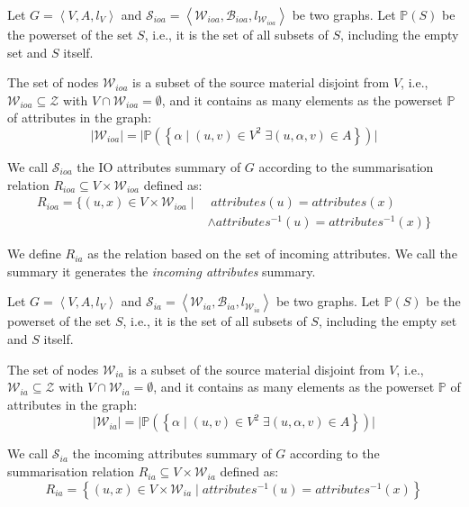 \begin{definition}
	Let $G=\left\langle V, A, l_V \right\rangle$ and $\mathcal{S}_{ioa} = \left\langle \mathcal{W}_{ioa}, \mathcal{B}_{ioa}, l_{\mathcal{W}_{ioa}} \right\rangle$ be two graphs. Let $\mathbb{P}(S)$ be the powerset of the set $S$, i.e., it is the set of all subsets of $S$, including the empty set and $S$ itself.

	The set of nodes $\mathcal{W}_{ioa}$ is a subset of the source material disjoint from $V$, i.e., $\mathcal{W}_{ioa} \subseteq \mathcal{Z}$ with $V \cap \mathcal{W}_{ioa} = \emptyset$, and it contains as many elements as the powerset $\mathbb{P}$ of attributes in the graph:
	$$
	\lvert \mathcal{W}_{ioa} \rvert = \lvert \mathbb{P}\left( \left\lbrace \alpha \mid (u, v) \in V^2\; \exists (u, \alpha, v) \in A \right\rbrace \right) \rvert
	$$

	We call $\mathcal{S}_{ioa}$ the IO attributes summary of $G$ according to the summarisation relation $R_{ioa} \subseteq V \times \mathcal{W}_{ioa}$ defined as:
	$$
	\begin{aligned}
	R_{ioa} =
	\{
	(u, x) \in V \times \mathcal{W}_{ioa} \mid &\; attributes(u) = attributes(x) \\
	& \wedge attributes^{-1}(u) = attributes^{-1}(x)
	\}
	\end{aligned}
	$$
	\label{def:ioa}
\end{definition}

\vspace{.5cm}


We define $R_{ia}$ as the relation based on the set of incoming attributes. We call the summary it generates the \emph{incoming attributes} summary.

\begin{definition}
	Let $G=\left\langle V, A, l_V \right\rangle$ and $\mathcal{S}_{ia} = \left\langle \mathcal{W}_{ia}, \mathcal{B}_{ia}, l_{\mathcal{W}_{ia}} \right\rangle$ be two graphs. Let $\mathbb{P}(S)$ be the powerset of the set $S$, i.e., it is the set of all subsets of $S$, including the empty set and $S$ itself.

	The set of nodes $\mathcal{W}_{ia}$ is a subset of the source material disjoint from $V$, i.e., $\mathcal{W}_{ia} \subseteq \mathcal{Z}$ with $V \cap \mathcal{W}_{ia} = \emptyset$, and it contains as many elements as the powerset $\mathbb{P}$ of attributes in the graph:
	$$
	\lvert \mathcal{W}_{ia} \rvert = \lvert \mathbb{P}\left( \left\lbrace \alpha \mid (u, v) \in V^2\; \exists (u, \alpha, v) \in A \right\rbrace \right) \rvert
	$$

	We call $\mathcal{S}_{ia}$ the incoming attributes summary of $G$ according to the summarisation relation $R_{ia} \subseteq V \times \mathcal{W}_{ia}$ defined as:
	$$
	R_{ia} = \left\lbrace (u, x) \in V \times \mathcal{W}_{ia} \mid attributes^{-1}(u) = attributes^{-1}(x) \right\rbrace
	$$
	\label{def:ia}
\end{definition}

